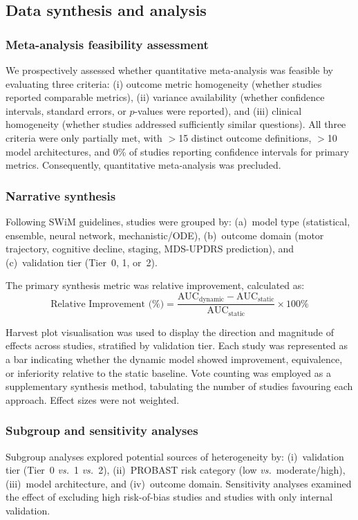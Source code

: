 \documentclass[11pt,a4paper]{article}
\begin{document}
\subsection{Data synthesis and analysis}

\subsubsection{Meta-analysis feasibility assessment}
We prospectively assessed whether quantitative meta-analysis was feasible by evaluating three criteria: (i) outcome metric homogeneity (whether studies reported comparable metrics), (ii) variance availability (whether confidence intervals, standard errors, or $p$-values were reported), and (iii) clinical homogeneity (whether studies addressed sufficiently similar questions). All three criteria were only partially met, with $>$15 distinct outcome definitions, $>$10 model architectures, and 0\% of studies reporting confidence intervals for primary metrics. Consequently, quantitative meta-analysis was precluded.

\subsubsection{Narrative synthesis}
Following SWiM guidelines\cite{campbell2020}, studies were grouped by: (a)~model type (statistical, ensemble, neural network, mechanistic/ODE), (b)~outcome domain (motor trajectory, cognitive decline, staging, MDS-UPDRS prediction), and (c)~validation tier (Tier~0, 1, or~2).

The primary synthesis metric was relative improvement, calculated as:
\begin{equation}
    \text{Relative Improvement (\%)} = \frac{\text{AUC}_{\text{dynamic}} - \text{AUC}_{\text{static}}}{\text{AUC}_{\text{static}}} \times 100\%
\end{equation}

Harvest plot visualisation was used to display the direction and magnitude of effects across studies, stratified by validation tier\cite{ogilvie2008}. Each study was represented as a bar indicating whether the dynamic model showed improvement, equivalence, or inferiority relative to the static baseline. Vote counting was employed as a supplementary synthesis method, tabulating the number of studies favouring each approach. Effect sizes were not weighted.

\subsubsection{Subgroup and sensitivity analyses}
Subgroup analyses explored potential sources of heterogeneity by: (i)~validation tier (Tier~0 \textit{vs.}~1 \textit{vs.}~2), (ii)~PROBAST risk category (low \textit{vs.}\ moderate/high), (iii)~model architecture, and (iv)~outcome domain. Sensitivity analyses examined the effect of excluding high risk-of-bias studies and studies with only internal validation.
\end{document}
